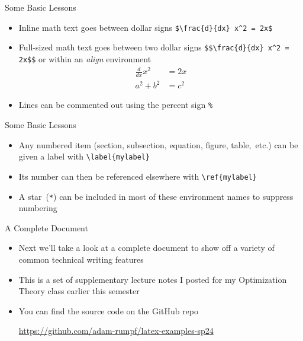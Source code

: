 \documentclass{beamer} %
\begin{document}
\begin{frame}{Some Basic Lessons}

\begin{itemize}
	\item Inline math text goes between dollar signs {\tt \$\textbackslash frac\{d\}\{dx\} x\^{}2 = 2x\$}
	\item Full-sized math text goes between two dollar signs {\tt \$\$\textbackslash frac\{d\}\{dx\} x\^{}2 = 2x\$\$} or within an \textit{align} environment
	\begin{align*}
		\frac{d}{dx} x^2 &= 2x \\
		a^2 + b^2 &= c^2
	\end{align*}
	\item Lines can be commented out using the percent sign \texttt{\%}
\end{itemize}

\end{frame}

\begin{frame}{Some Basic Lessons}

\begin{itemize}
	\item Any numbered item (section, subsection, equation, figure, table,~etc.) can be given a label with {\tt \textbackslash label\{mylabel\}}
	\item Its number can then be referenced elsewhere with {\tt \textbackslash ref\{mylabel\}}
	\item A star~(\texttt{*}) can be included in most of these environment names to suppress numbering
\end{itemize}

\end{frame}

\begin{frame}{A Complete Document}

\begin{itemize}
	\item Next we'll take a look at a complete document to show off a variety of common technical writing features
	\item This is a set of supplementary lecture notes I posted for my Optimization Theory class earlier this semester
	\item You can find the source code on the GitHub repo
	
	\url{https://github.com/adam-rumpf/latex-examples-sp24}
\end{itemize}

\end{frame}
\end{document}
